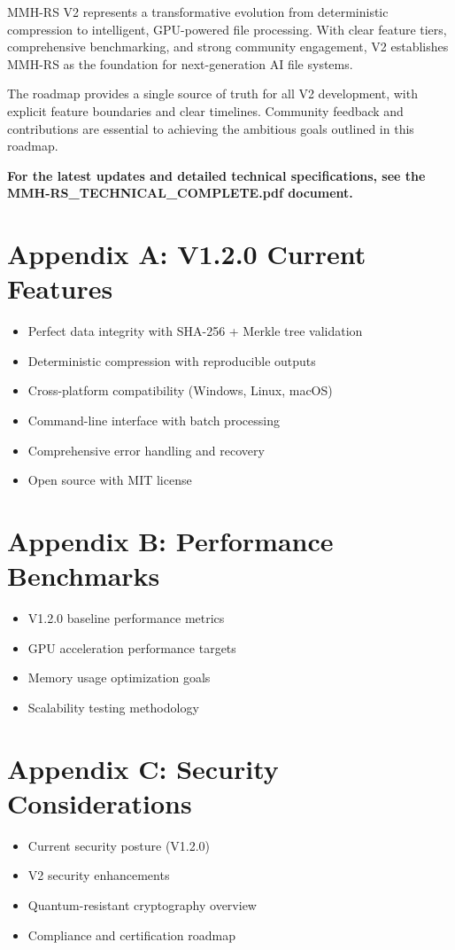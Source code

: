 \documentclass[12pt,a4paper]{article}
\begin{document}
MMH-RS V2 represents a transformative evolution from deterministic compression to intelligent, GPU-powered file processing. With clear feature tiers, comprehensive benchmarking, and strong community engagement, V2 establishes MMH-RS as the foundation for next-generation AI file systems.

The roadmap provides a single source of truth for all V2 development, with explicit feature boundaries and clear timelines. Community feedback and contributions are essential to achieving the ambitious goals outlined in this roadmap.

\textbf{For the latest updates and detailed technical specifications, see the MMH-RS\_TECHNICAL\_COMPLETE.pdf document.}

\appendix

\section{Appendix A: V1.2.0 Current Features}
\begin{itemize}
    \item Perfect data integrity with SHA-256 + Merkle tree validation
    \item Deterministic compression with reproducible outputs
    \item Cross-platform compatibility (Windows, Linux, macOS)
    \item Command-line interface with batch processing
    \item Comprehensive error handling and recovery
    \item Open source with MIT license
\end{itemize}

\section{Appendix B: Performance Benchmarks}
\begin{itemize}
    \item V1.2.0 baseline performance metrics
    \item GPU acceleration performance targets
    \item Memory usage optimization goals
    \item Scalability testing methodology
\end{itemize}

\section{Appendix C: Security Considerations}
\begin{itemize}
    \item Current security posture (V1.2.0)
    \item V2 security enhancements
    \item Quantum-resistant cryptography overview
    \item Compliance and certification roadmap
\end{itemize}
\end{document}
